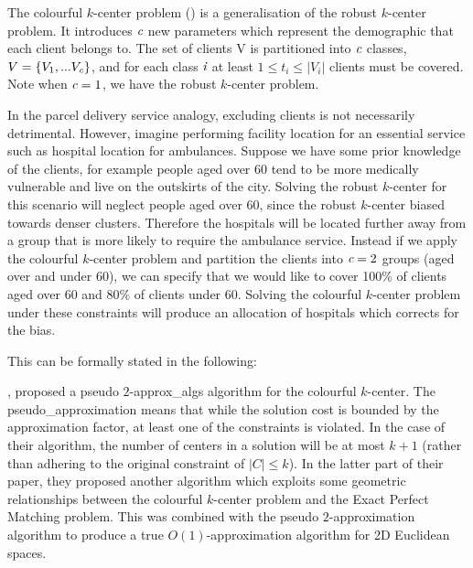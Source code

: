 The colourful $k$-center problem (\cite{bandyapadhyay_constant_2019}) is a generalisation of the robust $k$-center problem. It introduces $\emph{c}$ new parameters which represent the demographic that each client belongs to. The set of clients V is partitioned into $\emph{c}$ classes, $V=\{V_1,... V_{\emph{c}}\}$, and for each class $\emph{i}$ at least $1\leq t_i \leq |V_i|$ clients must be covered. Note when $\emph{c}=1$, we have the robust $k$-center problem.

In the parcel delivery service analogy, excluding clients is not necessarily detrimental. However, imagine performing facility location for an essential service such as hospital location for ambulances. Suppose we have some prior knowledge of the clients, for example people aged over 60 tend to be more medically vulnerable and live on the outskirts of the city. Solving the robust $k$-center for this scenario will neglect people aged over 60, since the robust $k$-center biased towards denser clusters. Therefore the hospitals will be located further away from a group that is more likely to require the ambulance service. Instead if we apply the colourful $k$-center problem and partition the clients into $\emph{c}=2$ groups (aged over and under 60), we can specify that we would like to cover 100\% of clients aged over 60 and 80\% of clients under 60. Solving the colourful $k$-center problem under these constraints will produce an allocation of hospitals which corrects for the bias.

This can be formally stated in the following:


\citeauthor{bandyapadhyay_constant_2019}, proposed a pseudo $2$-\gls{approx_algs} algorithm for the colourful $k$-center. The \gls{pseudo_approximation} means that while the solution cost is bounded by the approximation factor, at least one of the constraints is violated. In the case of their algorithm, the number of centers in a solution will be at most $k+1$ (rather than adhering to the original constraint of $|C|\leq k$). In the latter part of their paper, they proposed another algorithm which exploits some geometric relationships between the colourful $k$-center problem and the Exact Perfect Matching problem. This was combined with the pseudo $2$-approximation algorithm to produce a true $O(1)$-approximation algorithm for 2D Euclidean spaces.

